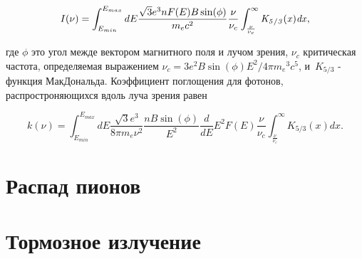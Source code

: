 \begin{equation} \label{emission}
	I(\nu)=\int_{E_{min}}^{E_{max}} dE \frac {\sqrt {3}{e}^{3}n F(E) B \sin ( \phi)}{{m_e}{c}^{2}}
	\frac{\nu}{\nu_c}\int_{\frac {\nu}{\nu_c}}^{\infty }\it K_{5/3}(x)dx,
\end{equation}

где $\phi$ это угол межде вектором магнитного поля и лучом зрения, $\displaystyle\nu_{c}$ критическая частота, определяемая выражением $\displaystyle\nu_{c} = 3 e^{2} B \sin(\phi) E^{2}/4\pi {m_{e}}^{3} c^{5}$, и~$K_{5/3}$ - функция МакДональда.
Коэффициент поглощения для фотонов, распростроняющихся вдоль луча зрения равен

\begin{equation}\label{absorption}
	k(\nu)=\int_{E_{min}}^{E_{max}}dE\frac {\sqrt {3}{e}^{3}}{8\pi m_e \nu^2}\frac{n B\sin(\phi)}{E^2}
	\frac{d}{dE} E^2 F(E)\frac {\nu}{ \nu_c}\int_{\frac {\nu}{ \nu_c}}^{\infty }K_{5/3}(x) dx.
\end{equation}

\section{Распад пионов}

\section{Тормозное излучение}